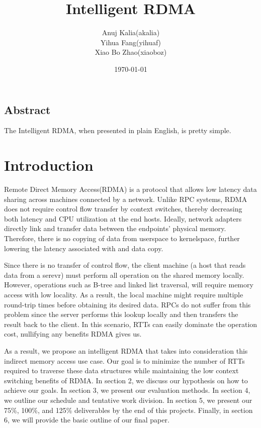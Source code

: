 \documentclass[a4paper, oneside, 12pt]{article}
\title{Intelligent RDMA} %
\author{Anuj Kalia(akalia)\\
		Yihua Fang(yihuaf)\\
		Xiao Bo Zhao(xiaoboz)}
\date{\today} %
\begin{document}
\maketitle
\thispagestyle{empty}
\newpage
\begin{center}
\vspace*{\fill}
\section*{Abstract}
The Intelligent RDMA, when presented in plain English, is pretty simple.\\
\vspace*{\fill}
\newpage
\end{center}


\section{Introduction}
Remote Direct Memory Access(RDMA) is a protocol that allows low latency data
sharing across machines connected by a network. Unlike RPC systems, RDMA does
not require control flow transfer by context switches, thereby decreasing both
latency and CPU utilization at the end hosts. Ideally, network adapters
directly link and transfer data between the endpoints' physical memory.
Therefore, there is no copying of data from userspace to kernelspace, further
lowering the latency associated with and data copy.

Since there is no transfer of control flow, the client machine (a host that
reads data from a serevr) must perform all operation on the shared memory
locally. However, operations such as B-tree and linked list traversal, will
require memory access with low locality. As a result, the local machine might
require multiple round-trip times before obtaining its desired data. RPCs do
not suffer from this problem since the server performs this lookup locally and
then transfers the result back to the client. In this scenario, RTTs can easily
dominate the operation cost, nullifying any benefits RDMA gives us.

As a result, we propose an intelligent RDMA that takes into consideration this
indirect memory access use case. Our goal is to minimize the number of RTTs
required to traverse these data structures while maintaining the low context
switching benefits of RDMA. In section 2, we discuss our hypothesis on how to
achieve our goals. In section 3, we present our evaluation methods. In section
4, we outline our schedule and tentative work division. In section 5, we
present our 75\%, 100\%, and 125\% deliverables by the end of this projects.
Finally, in section 6, we will provide the basic outline of our final paper.
\end{document}
